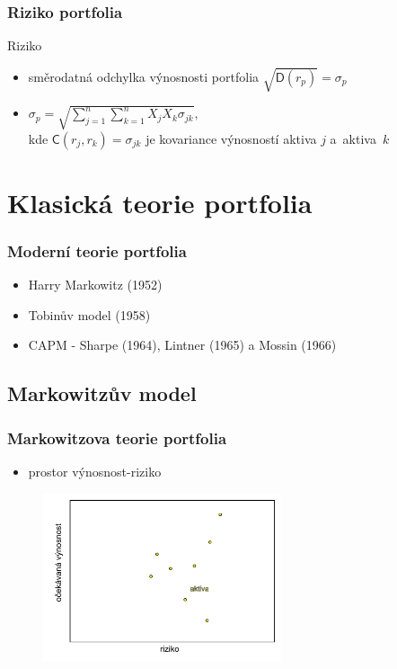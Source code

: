 \documentclass[xcolor=dvipsnames]{beamer}
\theoremstyle{definition} \newtheorem{definice}[veta]{Definice}
\theoremstyle{remark}
\begin{document}
\begin{frame}
 \frametitle{Riziko portfolia}
  \textcolor{OliveGreen}{Riziko}
  \begin{itemize}
   \item směrodatná odchylka výnosnosti portfolia $\sqrt{\mathsf{D}(r_p)}=\sigma_p$
   \item $\sigma_p=\sqrt{\sum_{j=1}^n\sum_{k=1}^nX_jX_k\sigma_{jk}},$ \\
         kde $\mathsf{C}(r_j,r_k)=\sigma_{jk}$  je kovariance výnosností aktiva $j$ a~aktiva~$k$    
  \end{itemize}
\end{frame}

\section{Klasická teorie portfolia}

\begin{frame}
  \frametitle{Moderní teorie portfolia}
   \begin{itemize}
   \item Harry Markowitz (1952)
   \item Tobinův model (1958)
   \item CAPM - Sharpe (1964), Lintner (1965) a Mossin (1966)
  \end{itemize}
\end{frame}

\subsection{Markowitzův model}

\begin{frame}
  \frametitle{Markowitzova teorie portfolia}
  \begin{itemize}
   \item prostor výnosnost-riziko 
  \end{itemize}

 \begin{figure}[!htbp]
  \centering 
  \includegraphics[width=7cm]{IMG/graf_4a.pdf}
 \end{figure}
\end{frame}
\end{document}
